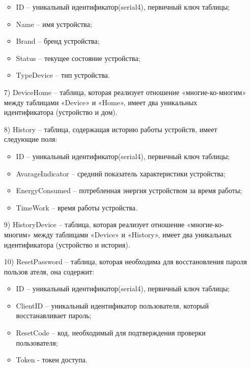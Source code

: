 \begin{enumerate}
    \begin{itemize}
        \item ID -- уникальный идентификатор(serial4), первичный ключ таблицы;
        \item Name -- имя устройства;
        \item Brand -- бренд устройства;
        \item Status -- текущее состояние устройства;
        \item TypeDevice -- тип устройства.
    \end{itemize}
    \item[7)] DeviceHome -- таблица, которая реализует отношение 
    «многие-ко-многим» между таблицами «Device» и «Home»,
    имеет два уникальных идентификатора (устройство и дом).
    \item[8)] History -- таблица, содержащая историю работы устройств, имеет следующие поля:
    \begin{itemize}
        \item ID -- уникальный идентификатор(serial4), первичный ключ таблицы;
        \item AvarageIndicator -- средний показатель характеристики устройства;
        \item EnergyConsumed -- потребленная энергия устройством за время работы;
        \item TimeWork -- время работы устройства.
    \end{itemize}
    \item[9)] HistoryDevice -- таблица, которая реализует отношение 
    «многие-ко-многим» между таблицами «Device» и «History»,
    имеет два уникальных идентификатора (устройство и история).
    \item[10)] ResetPassword -- таблица, которая необходима для восстановления пароля пользов ателя, она содержит:
    \begin{itemize}
        \item ID -- уникальный идентификатор(serial4), первичный ключ таблицы;
        \item ClientID -- уникальный идентификатор пользователя, который восстанавливает пароль;
        \item ResetCode -- код, необходимый для подтверждения проверки пользователя;
        \item Token - токен доступа.
    \end{itemize}
        
    
\end{enumerate}

